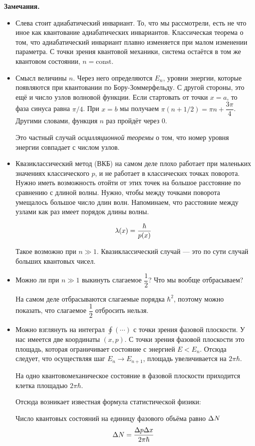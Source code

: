 \textbf{Замечания.}
\begin{itemize}
  \item Слева стоит адиабатический инвариант. То, что мы рассмотрели, есть не что иное как квантование адиабатических инвариантов. Классическая теорема о том, что адиабатический инвариант плавно изменяется при малом изменении параметра. С точки зрения квантовой механики, система остаётся в том же квантовом состоянии, $n = \mathrm{const}$.
  \item Смысл величины $n$. Через него определяются $E_n$, уровни энергии, которые появляются при квантовании по Бору-Зоммерфельду. С другой стороны, это ещё и число узлов волновой функции. Если стартовать от точки $x = a$, то фаза синуса равна $\pi / 4$. При $x = b$ мы получаем $\pi (n + 1/ 2) = \pi n + \dfrac{3 \pi}{4}$. Другими словами, функция $n$ раз пройдёт через 0.
      
      Это частный случай \emph{осцилляционной теоремы} о том, что номер уровня энергии совпадает с числом узлов.
      
  \item Квазиклассический метод (ВКБ) на самом деле плохо работает при маленьких значениях классического $p$, и не работает в классических точках поворота. Нужно иметь возможность отойти от этих точек на большое расстояние по сравнению с длиной волны. Нужно, чтобы между точками поворота умещалось большое число длин волн. Напоминаем, что расстояние между узлами как раз имеет порядок длины волны.
      
      $$
        \lambda (x) = \dfrac{\hbar}{p(x)}
      $$
      
      Такое возможно при $n \gg 1$. Квазиклассический случай --- это по сути случай больших квантовых чисел.
      
  \item Можно ли при $n \gg 1$ выкинуть слагаемое $\dfrac{1}{2}$? Что мы вообще отбрасываем?
  
  На самом деле отбрасываются слагаемые порядка $\hbar^2$, поэтому можно показать, что слагаемое $\dfrac{1}{2}$ отбросить нельзя.
  
  \item  Можно взглянуть на интеграл $\oint (\cdots)$ с точки зрения фазовой плоскости. У нас имеется две координаты $(x, p)$. С точки зрения фазовой плоскости это площадь, которая ограничивает состояние с энергией $E < E_n$. Отсюда следует, что осуществляя шаг $E_n \to E_{n+1}$, площадь увеличивается на $2 \pi \hbar$.
      
      На одно квантовомеханическое состояние в фазовой плоскости приходится клетка площадью $2 \pi \hbar$.
      
      Отсюда возникает известная формула статистической физики:
      
      Число квантовых состояний на единицу фазового объёма равно $\Delta N$
      $$
        \Delta N = \dfrac{\Delta p \Delta x}{2 \pi \hbar}
      $$
\end{itemize}

